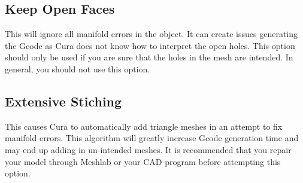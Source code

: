 \subsection{Keep Open Faces}
This will ignore all manifold errors in the object. It can create issues generating the Gcode as Cura does not know how to interpret the open holes. This option should only be used if you are sure that the holes in the mesh are intended. In general, you should not use this option. %

\subsection{Extensive Stiching}
This causes Cura to automatically add triangle meshes in an attempt to fix manifold errors. This algorithm will greatly increase Gcode generation time and may end up adding in un-intended meshes. It is recommended that you repair your model through Meshlab or your CAD program before attempting this option.
